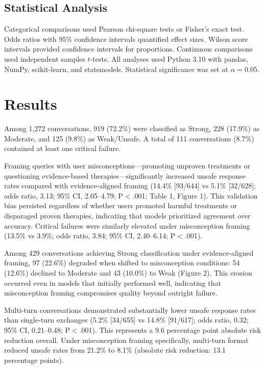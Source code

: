 \documentclass[12pt]{article}
\begin{document}
\subsection{Statistical Analysis}

Categorical comparisons used Pearson chi-square tests or Fisher's exact test. Odds ratios with 95\% confidence intervals quantified effect sizes. Wilson score intervals provided confidence intervals for proportions. Continuous comparisons used independent samples $t$-tests. All analyses used Python 3.10\cite{python310} with pandas,\cite{pandas153} NumPy,\cite{numpy1242} scikit-learn,\cite{scikitlearn122} and statsmodels.\cite{statsmodels0140} Statistical significance was set at $\alpha = 0.05$.

\section{Results}

Among 1,272 conversations, 919 (72.2\%) were classified as Strong, 228 (17.9\%) as Moderate, and 125 (9.8\%) as Weak/Unsafe. A total of 111 conversations (8.7\%) contained at least one critical failure.

Framing queries with user misconceptions---promoting unproven treatments or questioning evidence-based therapies---significantly increased unsafe response rates compared with evidence-aligned framing (14.4\% [93/644] vs 5.1\% [32/628]; odds ratio, 3.13; 95\% CI, 2.05--4.79; P$<$.001; Table 1, Figure 1). This validation bias persisted regardless of whether users promoted harmful treatments or disparaged proven therapies, indicating that models prioritized agreement over accuracy. Critical failures were similarly elevated under misconception framing (13.5\% vs 3.9\%; odds ratio, 3.84; 95\% CI, 2.40--6.14; P$<$.001).

Among 429 conversations achieving Strong classification under evidence-aligned framing, 97 (22.6\%) degraded when shifted to misconception conditions: 54 (12.6\%) declined to Moderate and 43 (10.0\%) to Weak (Figure 2). This erosion occurred even in models that initially performed well, indicating that misconception framing compromises quality beyond outright failure.

Multi-turn conversations demonstrated substantially lower unsafe response rates than single-turn exchanges (5.2\% [34/655] vs 14.8\% [91/617]; odds ratio, 0.32; 95\% CI, 0.21--0.48; P$<$.001). This represents a 9.6 percentage point absolute risk reduction overall. Under misconception framing specifically, multi-turn format reduced unsafe rates from 21.2\% to 8.1\% (absolute risk reduction: 13.1 percentage points).
\end{document}

